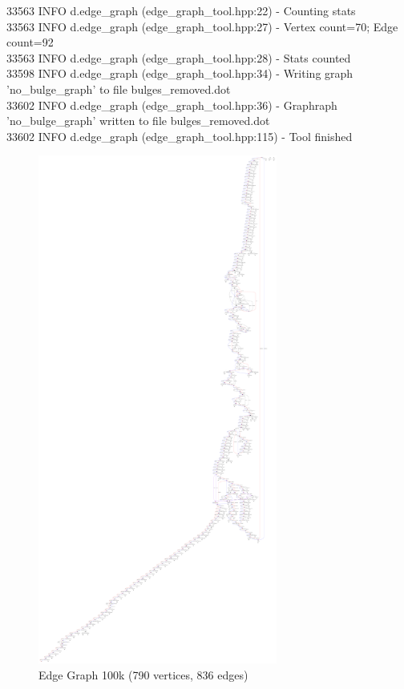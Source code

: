 \documentclass[14pt]{article}
\begin{document}
{{  33563  INFO d.edge\_graph (edge\_graph\_tool.hpp:22) - Counting stats \\
  33563  INFO d.edge\_graph (edge\_graph\_tool.hpp:27) - Vertex count=70; Edge count=92 \\
  33563  INFO d.edge\_graph (edge\_graph\_tool.hpp:28) - Stats counted \\
  33598  INFO d.edge\_graph (edge\_graph\_tool.hpp:34) - Writing graph 'no\_bulge\_graph' to file bulges\_removed.dot \\
  33602  INFO d.edge\_graph (edge\_graph\_tool.hpp:36) - Graphraph 'no\_bulge\_graph' written to file bulges\_removed.dot \\
  33602  INFO d.edge\_graph (edge\_graph\_tool.hpp:115) - Tool finished \\
}}

\newpage
\begin{figure}
\begin{center}
\includegraphics[width=0.7\textwidth]{edge_graph.pdf}
\end{center}
\caption{Edge Graph 100k (790 vertices, 836 edges)}
\end{figure}
\end{document}
